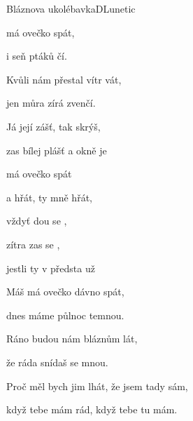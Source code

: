 \setcounter{page}{10}
\begin{song}{Bláznova ukolébavka}{D}{Lunetic}

\begin{SBVerse}

 má ovečko  spát,

i seň ptáků čí.

Kvůli nám přestal vítr vát,

jen můra zírá zvenčí.

Já  její zášť, tak  skrýš,

zas  bílej plášť a okně je 

\end{SBVerse}

\begin{SBChorus}

 má ovečko  spát

a  hřát, ty mně  hřát,

vždyť dou se ,

zítra zas  se ,

jestli ty v  předsta už 

\end{SBChorus}

\begin{SBVerse}

Máš má ovečko dávno spát,

dnes máme půlnoc temnou.

Ráno budou nám bláznům lát,

že ráda snídaš se mnou.

Proč měl bych jim lhát, že jsem tady sám,

když tebe mám rád, když tebe tu mám.

\end{SBVerse}

\begin{SBChorus}

\end{SBChorus}

\end{song}

\clearpage
